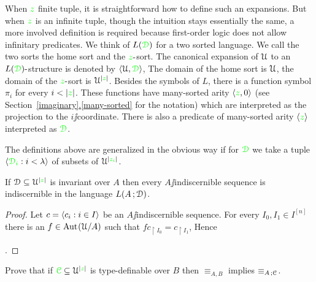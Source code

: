 \documentclass[creche.tex]{subfiles}
\begin{document}
When ${\color{green} z}$ finite tuple, it is straightforward how to define such an expansions. But when ${\color{green} z}$ is an infinite tuple, though the intuition stays essentially the same, a more involved definition is required because first-order logic does not allow infinitary predicates. We think of $L({\color{green}\EuScript D})$ for a two sorted language. We call the two sorts the home sort and the ${\color{green} z}\mbox{-}$sort. The canonical expansion of $\EuScript U$ to an $L({\color{green}\EuScript D})\mbox{-}$structure is denoted by $\langle\EuScript U,{\color{green}\EuScript D}\rangle$, The domain of the home sort is $\EuScript U$, the domain of the ${\color{green} z}\mbox{-}$sort is $\EuScript U^{|{\color{green} z}|}$. Besides the symbols of $L$, there is a function symbol $\pi_i$ for every $i<|{\gr z}|$. These functions have many-sorted arity $\langle{\color{green}z},0\rangle$  (see Section~\hyperref[many-sorted]{\ref*{imaginary}.\ref*{many-sorted}} for the notation) which are interpreted as the projection to the $i\jj$coordinate. There is also a predicate of many-sorted arity $\langle{\color{green}z}\rangle$ interpreted as ${\color{green}\EuScript D}$.

The definitions above are generalized in the obvious way if for ${\color{green}\EuScript D}$ we take a tuple $\langle{\color{green}\EuScript D_i}:i<\lambda\rangle$ of subsets of $\EuScript U^{|{\color{green} z_i}|}$.





\begin{proposition}\label{prop_indiscernible_L(A,D)}
If $\EuScript D\subseteq\EuScript U^{|{\color{green} z}|}$ is invariant over $A$ then every $A\jj$indiscernible sequence is indiscernible in the language $L(A\,;\EuScript D)$.
\end{proposition}

\begin{proof}
Let $c=\langle c_i:i\in I\rangle$ be an $A\jj$indiscernible sequence. For every $I_0,I_1\in I^{[n]}$ there is an $f\in\textrm{Aut\kern.15ex}(\EuScript U/A)$ such that $fc_{\restriction I_0}=c_{\restriction I_1}$, Hence 

.
\end{proof}



\begin{exercise}
Prove that if ${\color{green}\EuScript C}\subseteq\EuScript U^{|{\color{green} z}|}$ is type-definable over $B$ then $\equiv_{A,B}$ implies $\equiv_{A\,;\EuScript C}$.\QED
\end{exercise} 
\end{document}
